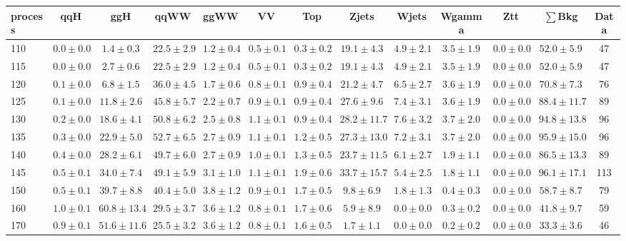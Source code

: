 \begin{table}
{%
 \tiny
 \begin{center}
 \begin{tabular}{l | c c | c c c c c c c c  | c c}
 \hline
 process & qqH & ggH & qqWW & ggWW & VV & Top & Zjets & Wjets & Wgamma & Ztt & $\sum$Bkg & Data \\
 \hline
110 & $0.0\pm0.0$ & $1.4\pm0.3$ & $22.5\pm2.9$ & $1.2\pm0.4$ & $0.5\pm0.1$ & $0.3\pm0.2$ & $19.1\pm4.3$ & $4.9\pm2.1$ & $3.5\pm1.9$ & $0.0\pm0.0$ & $52.0\pm5.9$ & 47 \\
115 & $0.0\pm0.0$ & $2.7\pm0.6$ & $22.5\pm2.9$ & $1.2\pm0.4$ & $0.5\pm0.1$ & $0.3\pm0.2$ & $19.1\pm4.3$ & $4.9\pm2.1$ & $3.5\pm1.9$ & $0.0\pm0.0$ & $52.0\pm5.9$ & 47 \\
120 & $0.1\pm0.0$ & $6.8\pm1.5$ & $36.0\pm4.5$ & $1.7\pm0.6$ & $0.8\pm0.1$ & $0.9\pm0.4$ & $21.2\pm4.7$ & $6.5\pm2.7$ & $3.6\pm1.9$ & $0.0\pm0.0$ & $70.8\pm7.3$ & 76 \\
125 & $0.1\pm0.0$ & $11.8\pm2.6$ & $45.8\pm5.7$ & $2.2\pm0.7$ & $0.9\pm0.1$ & $0.9\pm0.4$ & $27.6\pm9.6$ & $7.4\pm3.1$ & $3.6\pm1.9$ & $0.0\pm0.0$ & $88.4\pm11.7$ & 89 \\
130 & $0.2\pm0.0$ & $18.6\pm4.1$ & $50.8\pm6.2$ & $2.5\pm0.8$ & $1.1\pm0.1$ & $0.9\pm0.4$ & $28.2\pm11.7$ & $7.6\pm3.2$ & $3.7\pm2.0$ & $0.0\pm0.0$ & $94.8\pm13.8$ & 96 \\
135 & $0.3\pm0.0$ & $22.9\pm5.0$ & $52.7\pm6.5$ & $2.7\pm0.9$ & $1.1\pm0.1$ & $1.2\pm0.5$ & $27.3\pm13.0$ & $7.2\pm3.1$ & $3.7\pm2.0$ & $0.0\pm0.0$ & $95.9\pm15.0$ & 96 \\
140 & $0.4\pm0.0$ & $28.2\pm6.1$ & $49.7\pm6.0$ & $2.7\pm0.9$ & $1.0\pm0.1$ & $1.3\pm0.5$ & $23.7\pm11.5$ & $6.1\pm2.7$ & $1.9\pm1.1$ & $0.0\pm0.0$ & $86.5\pm13.3$ & 89 \\
145 & $0.5\pm0.1$ & $34.0\pm7.4$ & $49.1\pm5.9$ & $3.1\pm1.0$ & $1.1\pm0.1$ & $1.9\pm0.6$ & $33.7\pm15.7$ & $5.4\pm2.5$ & $1.8\pm1.1$ & $0.0\pm0.0$ & $96.1\pm17.1$ & 113 \\
150 & $0.5\pm0.1$ & $39.7\pm8.8$ & $40.4\pm5.0$ & $3.8\pm1.2$ & $0.9\pm0.1$ & $1.7\pm0.5$ & $9.8\pm6.9$ & $1.8\pm1.3$ & $0.4\pm0.3$ & $0.0\pm0.0$ & $58.7\pm8.7$ & 79 \\
160 & $1.0\pm0.1$ & $60.8\pm13.4$ & $29.5\pm3.7$ & $3.6\pm1.2$ & $0.8\pm0.1$ & $1.7\pm0.6$ & $5.9\pm8.9$ & $0.0\pm0.0$ & $0.3\pm0.2$ & $0.0\pm0.0$ & $41.8\pm9.7$ & 59 \\
170 & $0.9\pm0.1$ & $51.6\pm11.6$ & $25.5\pm3.2$ & $3.6\pm1.2$ & $0.8\pm0.1$ & $1.6\pm0.5$ & $1.7\pm1.1$ & $0.0\pm0.0$ & $0.2\pm0.2$ & $0.0\pm0.0$ & $33.3\pm3.6$ & 46 \\

\end{tabular}
\end{center}}
\end{table}
